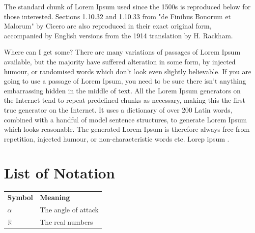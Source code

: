 \documentclass{ctuthesis}
\begin{document}
The standard chunk of Lorem Ipsum used since the 1500s is reproduced below for those interested. Sections 1.10.32 and 1.10.33 from "de Finibus Bonorum et Malorum" by Cicero are also reproduced in their exact original form, accompanied by English versions from the 1914 translation by H. Rackham.

Where can I get some?
There are many variations of passages of Lorem Ipsum available, but the majority have suffered alteration in some form, by injected humour, or randomised words which don't look even slightly believable. If you are going to use a passage of Lorem Ipsum, you need to be sure there isn't anything embarrassing hidden in the middle of text. All the Lorem Ipsum generators on the Internet tend to repeat predefined chunks as necessary, making this the first true generator on the Internet. It uses a dictionary of over 200 Latin words, combined with a handful of model sentence structures, to generate Lorem Ipsum which looks reasonable. The generated Lorem Ipsum is therefore always free from repetition, injected humour, or non-characteristic words etc.
Lorep ipsum \cite{arslan2015machine} \cite{Ioan2012ompl} \cite{karaman2011rrtstar} \cite{lavalle1998rapidly}.
\cite{gottschalk1996rapid}




\appendix
\chapter*{List of Notation}
\noindent
\begin{tabularx}{\linewidth}
  { l >{\raggedright\arraybackslash}X }
\bfseries Symbol & \bfseries Meaning \\\Midrule
$\alpha$ & The angle of attack \\
$\mathbb{R}$ & The real numbers \\
\end{tabularx}
 
\end{document}
